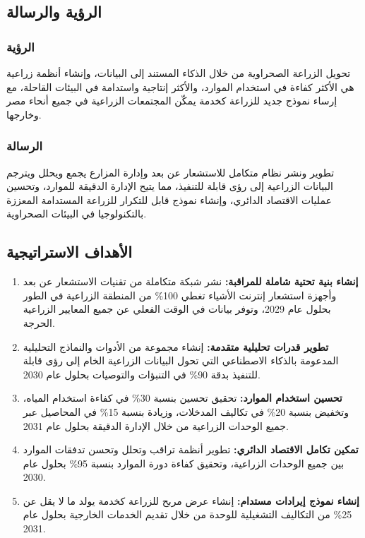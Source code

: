 \subsection{الرؤية والرسالة}

\subsubsection{الرؤية}
تحويل الزراعة الصحراوية من خلال الذكاء المستند إلى البيانات، وإنشاء أنظمة زراعية هي الأكثر كفاءة في استخدام الموارد، والأكثر إنتاجية واستدامة في البيئات القاحلة، مع إرساء نموذج جديد للزراعة كخدمة يمكّن المجتمعات الزراعية في جميع أنحاء مصر وخارجها.

\subsubsection{الرسالة}
تطوير ونشر نظام متكامل للاستشعار عن بعد وإدارة المزارع يجمع ويحلل ويترجم البيانات الزراعية إلى رؤى قابلة للتنفيذ، مما يتيح الإدارة الدقيقة للموارد، وتحسين عمليات الاقتصاد الدائري، وإنشاء نموذج قابل للتكرار للزراعة المستدامة المعززة بالتكنولوجيا في البيئات الصحراوية.

\subsection{الأهداف الاستراتيجية}

\begin{enumerate}
    \item \textbf{إنشاء بنية تحتية شاملة للمراقبة:} نشر شبكة متكاملة من تقنيات الاستشعار عن بعد وأجهزة استشعار إنترنت الأشياء تغطي 100\% من المنطقة الزراعية في الطور بحلول عام 2029، وتوفر بيانات في الوقت الفعلي عن جميع المعايير الزراعية الحرجة.
    
    \item \textbf{تطوير قدرات تحليلية متقدمة:} إنشاء مجموعة من الأدوات والنماذج التحليلية المدعومة بالذكاء الاصطناعي التي تحول البيانات الزراعية الخام إلى رؤى قابلة للتنفيذ بدقة 90\% في التنبؤات والتوصيات بحلول عام 2030.
    
    \item \textbf{تحسين استخدام الموارد:} تحقيق تحسين بنسبة 30\% في كفاءة استخدام المياه، وتخفيض بنسبة 20\% في تكاليف المدخلات، وزيادة بنسبة 15\% في المحاصيل عبر جميع الوحدات الزراعية من خلال الإدارة الدقيقة بحلول عام 2031.
    
    \item \textbf{تمكين تكامل الاقتصاد الدائري:} تطوير أنظمة تراقب وتحلل وتحسن تدفقات الموارد بين جميع الوحدات الزراعية، وتحقيق كفاءة دورة الموارد بنسبة 95\% بحلول عام 2030.
    
    \item \textbf{إنشاء نموذج إيرادات مستدام:} إنشاء عرض مربح للزراعة كخدمة يولد ما لا يقل عن 25\% من التكاليف التشغيلية للوحدة من خلال تقديم الخدمات الخارجية بحلول عام 2031.
\end{enumerate}

